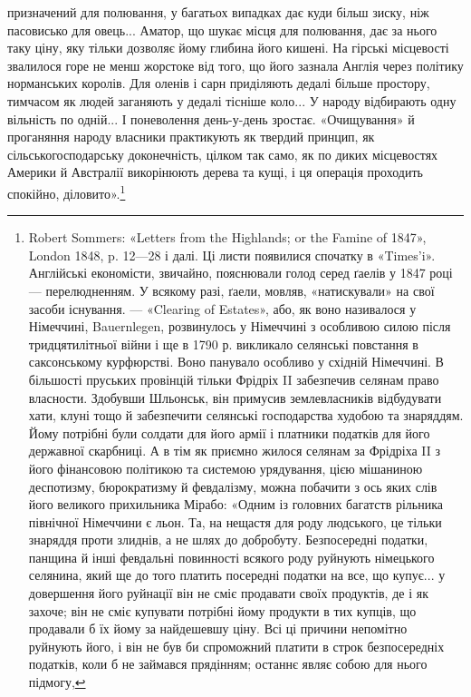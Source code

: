 \parcont{}  %
призначений для полювання, у багатьох випадках дає куди
більш зиску, ніж пасовисько для овець... Аматор, що шукає
місця для полювання, дає за нього таку ціну, яку тільки дозволяє
йому глибина його кишені. На гірські місцевості звалилося горе
не менш жорстоке від того, що його зазнала Англія через політику
норманських королів. Для оленів і сарн приділяють дедалі
більше простору, тимчасом як людей заганяють у дедалі тісніше
коло... У народу відбирають одну вільність по одній... І поневолення
день-у-день зростає. «Очищування» й проганяння
народу власники практикують як твердий принцип, як сільськогосподарську
доконечність, цілком так само, як по диких місцевостях
Америки й Австралії викорінюють дерева та кущі, і ця
операція проходить спокійно, діловито».\footnote{
Robert Sommers: «Letters from the Highlands; or the Famine
of 1847», London 1848, p. 12—28 і далі. Ці листи появилися спочатку
в «Times’i». Англійські економісти, звичайно, пояснювали голод серед
ґаелів у 1847 році — перелюдненням. У всякому разі, ґаели, мовляв,
«натискували» на свої засоби існування. — «Clearing of Estates», або,
як воно називалося у Німеччині, Bauernlegen, розвинулось у Німеччині
з особливою силою після тридцятилітньої війни і ще в 1790 р. викликало
селянські повстання в саксонському курфюрстві. Воно панувало особливо
у східній Німеччині. В більшості пруських провінцій тільки Фрідріх II
забезпечив селянам право власности. Здобувши Шльонськ, він примусив
землевласників відбудувати хати, клуні тощо й забезпечити селянські
господарства худобою та знаряддям. Йому потрібні були солдати для
його армії і платники податків для його державної скарбниці. А в тім
як приємно жилося селянам за Фрідріха II з його фінансовою політикою
та системою урядування, цією мішаниною деспотизму, бюрократизму
й февдалізму, можна побачити з ось яких слів його великого прихильника
Мірабо: «Одним із головних багатств рільника північної Німеччини
є льон. Та, на нещастя для роду людського, це тільки знаряддя проти
злиднів, а не шлях до добробуту. Безпосередні податки, панщина й інші
февдальні повинності всякого роду руйнують німецького селянина, який
ще до того платить посередні податки на все, що купує... у довершення
його руйнації він не сміє продавати своїх продуктів, де і як захоче; він
не сміє купувати потрібні йому продукти в тих купців, що продавали б
їх йому за найдешевшу ціну. Всі ці причини непомітно руйнують його,
і він не був би спроможний платити в строк безпосередніх податків,
коли б не займався прядінням; останнє являє собою для нього підмогу,
}
